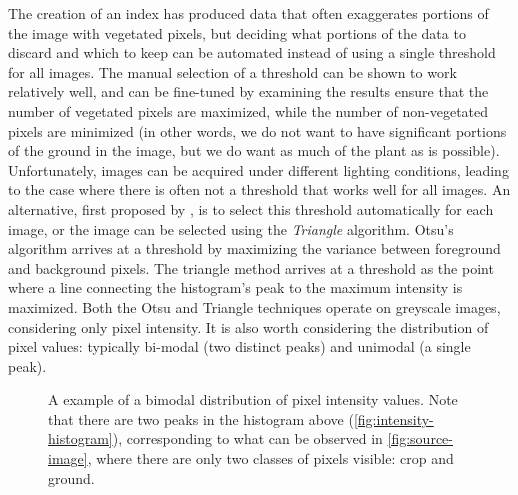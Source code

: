 \documentclass[agriculture,article,submit,pdftex,moreauthors]{Definitions/mdpi}
\begin{document}
The creation of an index has produced data that often exaggerates portions of the image with vegetated pixels, but deciding what portions of the data to discard and which to keep can be automated instead of using a single threshold for all images. The manual selection of a threshold can be shown to work relatively well, and can be fine-tuned by examining the results ensure that the number of vegetated pixels are maximized, while the number of non-vegetated pixels are minimized (in other words, we do not want to have significant portions of the ground in the image, but we do want as much of the plant as is possible). Unfortunately, images can be acquired under different lighting conditions, leading to the case where there is often not a threshold that works well for all images. An alternative, first proposed by \citeauthor{Otsu1979-io}  \cite{Otsu1979-io}, is to select this threshold automatically for each image, or the image can be selected using the \textit{Triangle} algorithm. Otsu's algorithm arrives at a threshold by maximizing the variance between foreground and background pixels. The triangle method arrives at a threshold as the point where a line connecting the histogram’s peak to the maximum intensity is maximized. Both the Otsu and Triangle techniques operate on greyscale images, considering only pixel intensity. It is also worth considering the distribution of pixel values: typically bi-modal (two distinct peaks) and unimodal (a single peak).

%

\begin{figure}[h]
	\centering
	\hfill
	\caption[Bimodal distribution of pixel intensity]{A example of a bimodal distribution of pixel intensity values. Note that there are two peaks in the histogram above (\ref{fig:intensity-histogram}), corresponding to what can be observed in \ref{fig:source-image}, where there are only two classes of pixels visible: crop and ground.}
	\label{fig:intensity}
\end{figure}
\end{document}
